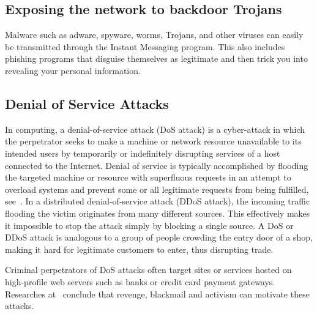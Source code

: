 \subsection{Exposing the network to backdoor Trojans}\label{subsec:exposing-the-network-to-backdoor-trojans}
Malware such as adware, spyware, worms, Trojans, and other viruses can easily be transmitted through the
Instant Messaging program.
This also includes phishing programs that disguise themselves as legitimate and then trick you into revealing
your personal information.

\subsection{Denial of Service Attacks}\label{subsec:denial-of-service-attacks}
In computing, a denial-of-service attack (DoS attack) is a cyber-attack in which the perpetrator seeks to make a machine or
network resource unavailable to its intended users by temporarily or indefinitely disrupting services of a host connected
to the Internet.
Denial of service is typically accomplished by flooding the targeted machine or resource with superfluous requests in
an attempt to overload systems and prevent some or all legitimate requests from being fulfilled, see~\cite{gu2007denial}.
In a distributed denial-of-service attack (DDoS attack), the incoming traffic flooding the victim originates from
many different sources.
This effectively makes it impossible to stop the attack simply by blocking a single source.
A DoS or DDoS attack is analogous to a group of people crowding the entry door of a shop, making it hard for legitimate
customers to enter, thus disrupting trade.

Criminal perpetrators of DoS attacks often target sites or services hosted on high-profile web servers such as banks or
credit card payment gateways.
Researches at~\cite{prince2016empty, halpin2012philosophy} conclude that revenge, blackmail and activism can
motivate these attacks.

